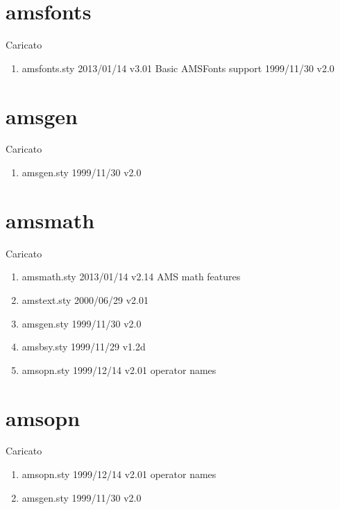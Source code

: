 \section{amsfonts}

Caricato 
\begin{enumerate}
\item amsfonts.sty 2013/01/14 v3.01 Basic AMSFonts support 1999/11/30 v2.0
\end{enumerate}
\section{amsgen}

Caricato 
\begin{enumerate}
\item amsgen.sty 1999/11/30 v2.0
\end{enumerate}
\section{amsmath}

Caricato 
\begin{enumerate}
\item amsmath.sty 2013/01/14 v2.14 AMS math features
\item amstext.sty 2000/06/29 v2.01
\item amsgen.sty 1999/11/30 v2.0
\item amsbsy.sty 1999/11/29 v1.2d
\item amsopn.sty 1999/12/14 v2.01 operator names
\end{enumerate}
\section{amsopn}

Caricato 
\begin{enumerate}
\item amsopn.sty 1999/12/14 v2.01 operator names
\item amsgen.sty 1999/11/30 v2.0
\end{enumerate}
